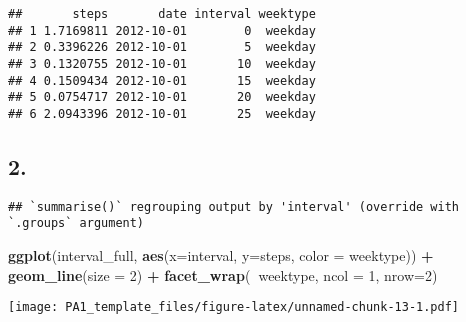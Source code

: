 \documentclass[
]{article}
\newenvironment{Shaded}{\begin{snugshade}}{\end{snugshade}}
\newcommand{\DataTypeTok}[1]{\textcolor[rgb]{0.13,0.29,0.53}{#1}}
\newcommand{\DecValTok}[1]{\textcolor[rgb]{0.00,0.00,0.81}{#1}}
\newcommand{\KeywordTok}[1]{\textcolor[rgb]{0.13,0.29,0.53}{\textbf{#1}}}
\newcommand{\NormalTok}[1]{#1}
\newcommand{\OperatorTok}[1]{\textcolor[rgb]{0.81,0.36,0.00}{\textbf{#1}}}
\newcommand{\StringTok}[1]{\textcolor[rgb]{0.31,0.60,0.02}{#1}}
\begin{document}
\begin{Shaded}
\end{Shaded}

\begin{verbatim}
##       steps       date interval weektype
## 1 1.7169811 2012-10-01        0  weekday
## 2 0.3396226 2012-10-01        5  weekday
## 3 0.1320755 2012-10-01       10  weekday
## 4 0.1509434 2012-10-01       15  weekday
## 5 0.0754717 2012-10-01       20  weekday
## 6 2.0943396 2012-10-01       25  weekday
\end{verbatim}

\hypertarget{section}{%
\subsection{2.}\label{section}}

\begin{Shaded}
\end{Shaded}

\begin{verbatim}
## `summarise()` regrouping output by 'interval' (override with `.groups` argument)
\end{verbatim}

\begin{Shaded}
\begin{Highlighting}[]
\KeywordTok{ggplot}\NormalTok{(interval_full, }\KeywordTok{aes}\NormalTok{(}\DataTypeTok{x=}\NormalTok{interval, }\DataTypeTok{y=}\NormalTok{steps, }\DataTypeTok{color =}\NormalTok{ weektype)) }\OperatorTok{+}
\StringTok{  }\KeywordTok{geom_line}\NormalTok{(}\DataTypeTok{size =} \DecValTok{2}\NormalTok{) }\OperatorTok{+}
\StringTok{  }\KeywordTok{facet_wrap}\NormalTok{(}\OperatorTok{~}\NormalTok{weektype, }\DataTypeTok{ncol =} \DecValTok{1}\NormalTok{, }\DataTypeTok{nrow=}\DecValTok{2}\NormalTok{)}
\end{Highlighting}
\end{Shaded}

\texttt{[image: PA1\_template\_files/figure-latex/unnamed-chunk-13-1.pdf]}
\end{document}
